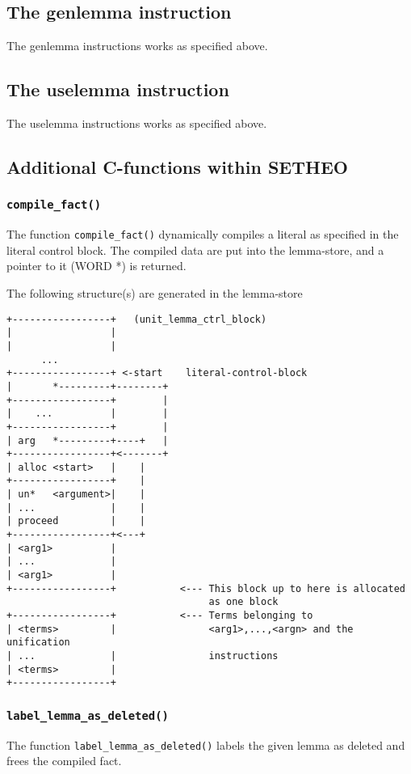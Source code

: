 \subsection{The genlemma instruction}
The genlemma instructions works as specified above.
\subsection{The uselemma instruction}
The uselemma instructions works as specified above.

\subsection{Additional C-functions within SETHEO}

\subsubsection{{\tt compile\_fact()}}

The function {\tt compile\_fact()} dynamically compiles
a literal as specified in the literal control block.
The compiled data are put into the lemma-store, and a pointer to it (WORD *)
is returned.

The following structure(s) are generated in the lemma-store

\begin{verbatim}
+-----------------+   (unit_lemma_ctrl_block)
|                 |
|                 |
      ...
+-----------------+ <-start    literal-control-block
|       *---------+--------+    
+-----------------+        |
|    ...          |        |
+-----------------+        |
| arg   *---------+----+   |
+-----------------+<-------+
| alloc <start>   |    |
+-----------------+    |
| un*   <argument>|    |
| ...             |    |
| proceed         |    |
+-----------------+<---+
| <arg1>          |
| ...             |
| <arg1>          |
+-----------------+           <--- This block up to here is allocated
                                   as one block
+-----------------+           <--- Terms belonging to
| <terms>         |                <arg1>,...,<argn> and the unification
| ...             |                instructions
| <terms>         |
+-----------------+   
\end{verbatim}

\subsubsection{{\tt label\_lemma\_as\_deleted()}}
The function {\tt label\_lemma\_as\_deleted()} labels the given lemma
as deleted and frees the compiled fact.

